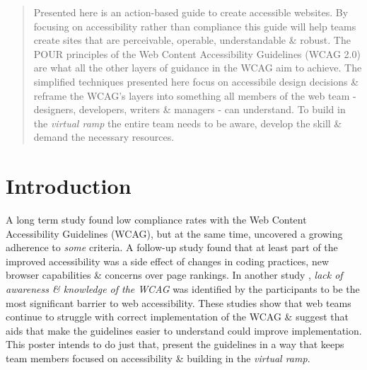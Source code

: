 \documentclass{acm_proc_article-sp}
\begin{document}
\maketitle
\begin{abstract}
Presented here is an action-based guide to create accessible websites. By focusing on accessibility rather than compliance this guide will help teams create sites that are perceivable, operable, understandable \& robust. The POUR principles of the Web Content Accessibility Guidelines (WCAG 2.0) are what all the other layers of guidance in the WCAG aim to achieve. The simplified techniques presented here focus on accessibile design decisions \& reframe the WCAG's layers into something all members of the web team - designers, developers, writers \& managers - can understand. To build in the \textit{virtual ramp} the entire team needs to be aware, develop the skill \& demand the necessary resources.

\end{abstract}



\section{Introduction}
A long term study \cite{hanson:progress} found low compliance rates with the Web Content Accessibility Guidelines (WCAG), but at the same time, uncovered a growing adherence to \textit{some} criteria. A follow-up study \cite{richards:side} found that at least part of the improved accessibility was a side effect of changes in coding practices, new browser capabilities \& concerns over page rankings. In another study \cite{lazar:perceptions}, \textit{lack of awareness \& knowledge of the WCAG} was identified by the participants to be the most significant barrier to web accessibility. These studies show that web teams continue to struggle with correct implementation of the WCAG \& suggest that aids that make the guidelines easier to understand could improve implementation. This poster intends to do just that, present the guidelines in a way that keeps team members focused on accessibility \& building in the \textit{virtual ramp}. 
\end{document}

